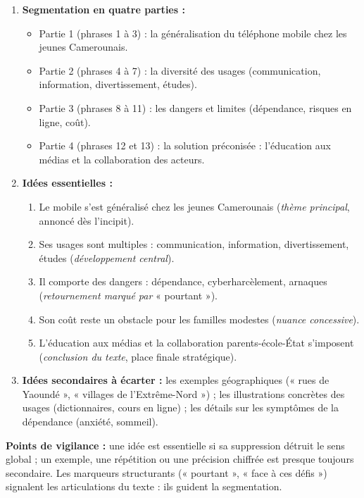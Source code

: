 \documentclass[11pt]{article}
\begin{document}
\begin{corrige}
\begin{enumerate}
\item \textbf{Segmentation en quatre parties :}
\begin{itemize}
\item Partie 1 (phrases 1 à 3) : la généralisation du téléphone mobile chez les jeunes Camerounais.
\item Partie 2 (phrases 4 à 7) : la diversité des usages (communication, information, divertissement, études).
\item Partie 3 (phrases 8 à 11) : les dangers et limites (dépendance, risques en ligne, coût).
\item Partie 4 (phrases 12 et 13) : la solution préconisée : l'éducation aux médias et la collaboration des acteurs.
\end{itemize}
\item \textbf{Idées essentielles :}
\begin{enumerate}
\item Le mobile s'est généralisé chez les jeunes Camerounais (\emph{thème principal}, annoncé dès l'incipit).
\item Ses usages sont multiples : communication, information, divertissement, études (\emph{développement central}).
\item Il comporte des dangers : dépendance, cyberharcèlement, arnaques (\emph{retournement marqué par} « pourtant »).
\item Son coût reste un obstacle pour les familles modestes (\emph{nuance concessive}).
\item L'éducation aux médias et la collaboration parents-école-État s'imposent (\emph{conclusion du texte}, place finale stratégique).
\end{enumerate}
\item \textbf{Idées secondaires à écarter :} les exemples géographiques (« rues de Yaoundé », « villages de l'Extrême-Nord ») ; les illustrations concrètes des usages (dictionnaires, cours en ligne) ; les détails sur les symptômes de la dépendance (anxiété, sommeil).
\end{enumerate}
\textbf{Points de vigilance :} une idée est essentielle si sa suppression détruit le sens global ; un exemple, une répétition ou une précision chiffrée est presque toujours secondaire. Les marqueurs structurants (« pourtant », « face à ces défis ») signalent les articulations du texte : ils guident la segmentation.
\end{corrige}
\end{document}

